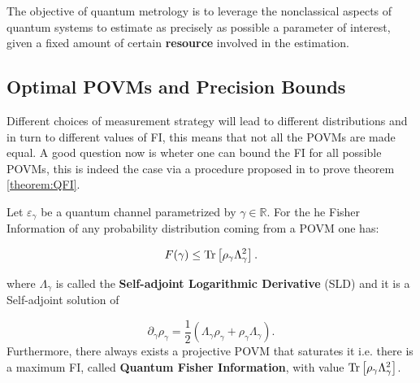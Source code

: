 The objective of quantum metrology is to leverage the nonclassical
aspects of quantum systems to estimate as precisely as possible a
parameter of interest, given a fixed amount of certain
\textbf{resource} involved in the estimation.

\subsection{Optimal POVMs and Precision Bounds}
Different choices of measurement strategy will lead to different
distributions and in turn to different values of FI, this means
that not all the POVMs are made equal. A good
question now is wheter one can bound the FI for all possible
POVMs, this is indeed the case via a procedure proposed in
\cite{braunstein_statistical_1994} to prove theorem \ref{theorem:QFI}.

\begin{theorem}\label{theorem:QFI}
  Let $\varepsilon_{\gamma}$ be a quantum channel parametrized by $\gamma \in \mathds{R}$. For the he Fisher Information of any probability distribution coming from a POVM one has:

  \begin{equation}
F(\gamma) \leq  \mathrm{Tr}\left[\rho_{\gamma}\Lambda_{\gamma}^{2}\right].
\end{equation}

where $\Lambda_{\gamma}$ is called the  \textbf{Self-adjoint Logarithmic Derivative} (SLD) and it is a Self-adjoint solution of

\begin{equation}\label{eq:SLD_definition}
  \partial_{\gamma}\rho_{\gamma} = \frac{1}{2}\left(\Lambda_{\gamma}\rho_{\gamma} + \rho_{\gamma}\Lambda_{\gamma} \right).
\end{equation}
Furthermore, there always exists a projective POVM that saturates it \cite{paris_quantum_2009} i.e. there is a maximum FI, called \textbf{Quantum Fisher Information}, with value $\mathrm{Tr}\left[\rho_{\gamma}\Lambda_{\gamma}^{2}\right]$.
\end{theorem}

